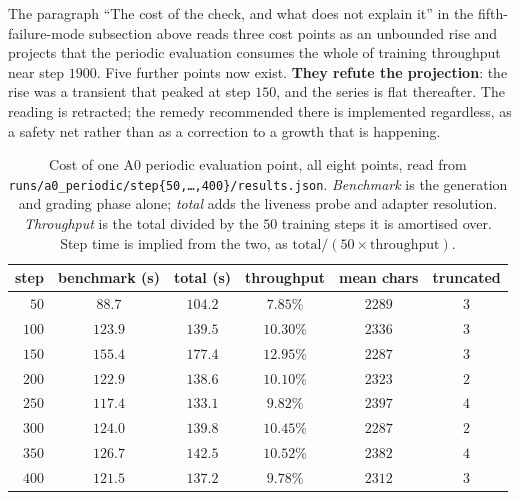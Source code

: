 The paragraph ``The cost of the check, and what does not explain it'' in the fifth-failure-mode
subsection above reads three cost points as an unbounded rise and projects that the periodic
evaluation consumes the whole of training throughput near step $1900$. Five further points now
exist. \textbf{They refute the projection}: the rise was a transient that peaked at step $150$,
and the series is flat thereafter. The reading is retracted; the remedy recommended there is
implemented regardless, as a safety net rather than as a correction to a growth that is
happening.

\begin{table}[t]
\centering\small
\caption{Cost of one A0 periodic evaluation point, all eight points, read from
\texttt{runs/a0\_periodic/step\{50,\dots,400\}/results.json}. \emph{Benchmark} is the generation
and grading phase alone; \emph{total} adds the liveness probe and adapter resolution.
\emph{Throughput} is the total divided by the $50$ training steps it is amortised over.
Step time is implied from the two, as $\mathrm{total}/(50\times\mathrm{throughput})$.}
\label{tab:evalcost}
\begin{tabular}{rccccc}
\toprule
step & benchmark (s) & total (s) & throughput & mean chars & truncated \\
\midrule
$50$  & $88.7$  & $104.2$ & $7.85\%$  & $2289$ & $3$ \\
$100$ & $123.9$ & $139.5$ & $10.30\%$ & $2336$ & $3$ \\
$150$ & $155.4$ & $177.4$ & $12.95\%$ & $2287$ & $3$ \\
\midrule
$200$ & $122.9$ & $138.6$ & $10.10\%$ & $2323$ & $2$ \\
$250$ & $117.4$ & $133.1$ & $9.82\%$  & $2397$ & $4$ \\
$300$ & $124.0$ & $139.8$ & $10.45\%$ & $2287$ & $2$ \\
$350$ & $126.7$ & $142.5$ & $10.52\%$ & $2382$ & $4$ \\
$400$ & $121.5$ & $137.2$ & $9.78\%$  & $2312$ & $3$ \\
\bottomrule
\end{tabular}
\end{table}

